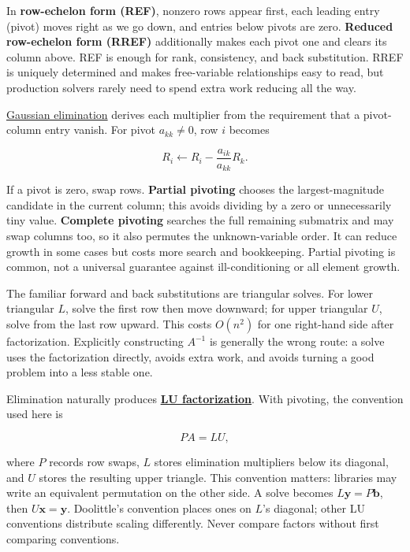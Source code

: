 In \textbf{row-echelon form (REF)}, nonzero rows appear first, each leading entry (pivot) moves right as we go down, and entries below pivots are zero. \textbf{Reduced row-echelon form (RREF)} additionally makes each pivot one and clears its column above. REF is enough for rank, consistency, and back substitution. RREF is uniquely determined and makes free-variable relationships easy to read, but production solvers rarely need to spend extra work reducing all the way.

\hyperref[01-foundations-i-ch019-elimination-turns-the-geometry-into-an-auditable-calculation]{Gaussian elimination} derives each multiplier from the requirement that a pivot-column entry vanish. For pivot \(a_{kk}\ne0\), row \(i\) becomes

\[
R_i\leftarrow R_i-\frac{a_{ik}}{a_{kk}}R_k.
\]

If a pivot is zero, swap rows. \textbf{Partial pivoting} chooses the largest-magnitude candidate in the current column; this avoids dividing by a zero or unnecessarily tiny value. \textbf{Complete pivoting} searches the full remaining submatrix and may swap columns too, so it also permutes the unknown-variable order. It can reduce growth in some cases but costs more search and bookkeeping. Partial pivoting is common, not a universal guarantee against ill-conditioning or all element growth.

The familiar forward and back substitutions are triangular solves. For lower triangular \(L\), solve the first row then move downward; for upper triangular \(U\), solve from the last row upward. This costs \(O(n^2)\) for one right-hand side after factorization. Explicitly constructing \(A^{-1}\) is generally the wrong route: a solve uses the factorization directly, avoids extra work, and avoids turning a good problem into a less stable one.

Elimination naturally produces \textbf{\hyperref[01-foundations-i-ch019-a-runnable-pivoted-lu-reference-preserves-the-elimination-history]{LU factorization}}. With pivoting, the convention used here is

\[
PA=LU,
\]

where \(P\) records row swaps, \(L\) stores elimination multipliers below its diagonal, and \(U\) stores the resulting upper triangle. This convention matters: libraries may write an equivalent permutation on the other side. A solve becomes \(L\mathbf y=P\mathbf b\), then \(U\mathbf x=\mathbf y\). Doolittle's convention places ones on \(L\)'s diagonal; other LU conventions distribute scaling differently. Never compare factors without first comparing conventions.

